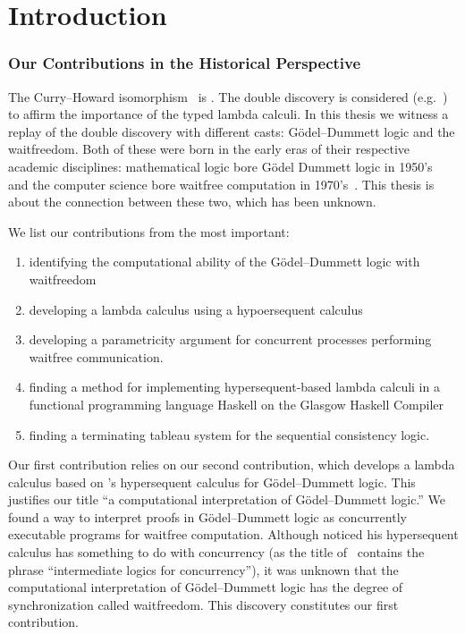 \chapter{Introduction}

\subsection{Our Contributions in the Historical Perspective}

The Curry--Howard isomorphism~\citep{curryhoward} is .
The double discovery is considered (e.g.~\citep{wadler2012propositions})
to affirm the importance of the typed lambda calculi.
In this thesis we witness a replay of the double discovery with
different casts: G\"odel--Dummett logic and the waitfreedom.
Both of these were born in the early eras of their respective academic
disciplines:
mathematical logic bore G\"odel Dummett logic in
1950's~\citep{dummett59}
and the
computer science bore waitfree computation in
1970's~\citep{lamport1979make}.
This thesis is about the connection between these two,
which has been unknown.

We list our contributions from the most important:
\begin{enumerate}
 \item identifying the computational ability of the
G\"odel--Dummett logic with waitfreedom
 \item developing a lambda calculus using
       a hypoersequent calculus
 \item developing a parametricity argument for
       concurrent processes performing waitfree communication.
 \item finding a method for implementing hypersequent-based lambda calculi in a
       functional programming language Haskell on the Glasgow Haskell
       Compiler
 \item finding a terminating tableau system for the sequential
       consistency logic.
\end{enumerate}

Our first contribution relies on our second contribution, which
develops a lambda calculus based on \citet{avron91}'s hypersequent
calculus for G\"odel--Dummett logic.  This justifies our title ``a
computational interpretation of G\"odel--Dummett logic.''
We found a way to interpret proofs in G\"odel--Dummett logic as
concurrently executable programs for waitfree computation.
Although \citet{avron91} noticed his hypersequent calculus has something
to do with concurrency (as the title of~\citep{avron91} contains the phrase
``intermediate logics for concurrency''), it was unknown that
the computational interpretation of G\"odel--Dummett logic has
the degree of synchronization called waitfreedom.  This discovery
constitutes our first contribution.

